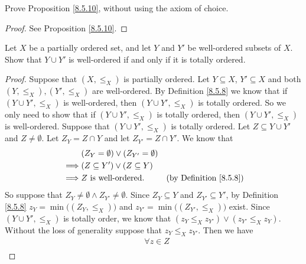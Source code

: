 \begin{exercise}\label{ex 8.5.10}
    Prove Proposition \ref{8.5.10}, without using the axiom of choice.
\end{exercise}

\begin{proof}
    See Proposition \ref{8.5.10}.
\end{proof}

\begin{exercise}\label{ex 8.5.11}
    Let \(X\) be a partially ordered set, and let \(Y\) and \(Y'\) be well-ordered subsets of \(X\).
    Show that \(Y \cup Y'\) is well-ordered if and only if it is totally ordered.
\end{exercise}

\begin{proof}
    Suppose that \((X, \leq_X)\) is partially ordered.
    Let \(Y \subseteq X\), \(Y' \subseteq X\) and both \((Y, \leq_X), (Y', \leq_X)\) are well-ordered.
    By Definition \ref{8.5.8} we know that if \((Y \cup Y', \leq_X)\) is well-ordered, then \((Y \cup Y', \leq_X)\) is totally ordered.
    So we only need to show that if \((Y \cup Y', \leq_X)\) is totally ordered, then \((Y \cup Y', \leq_X)\) is well-ordered.
    Suppose that \((Y \cup Y', \leq_X)\) is totally ordered.
    Let \(Z \subseteq Y \cup Y'\) and \(Z \neq \emptyset\).
    Let \(Z_Y = Z \cap Y\) and let \(Z_{Y'} = Z \cap Y'\).
    We know that
    \begin{align*}
                 & (Z_Y = \emptyset) \lor (Z_{Y'} = \emptyset)                                      \\
        \implies & (Z \subseteq Y') \lor (Z \subseteq Y)                                            \\
        \implies & Z \text{ is well-ordered}.                  & \text{(by Definition \ref{8.5.8})}
    \end{align*}
    So suppose that \(Z_Y \neq \emptyset \land Z_{Y'} \neq \emptyset\).
    Since \(Z_Y \subseteq Y\) and \(Z_{Y'} \subseteq Y'\), by Definition \ref{8.5.8} \(z_Y = \min\big((Z_Y, \leq_X)\big)\) and \(z_{Y'} = \min\big((Z_{Y'}, \leq_X)\big)\) exist.
    Since \((Y \cup Y', \leq_X)\) is totally order, we know that \((z_Y \leq_X z_{Y'}) \lor (z_{Y'} \leq_X z_Y)\).
    Without the loss of generality suppose that \(z_Y \leq_X z_{Y'}\).
    Then we have
    \begin{align*}
                 & \forall z \in Z                                                                       \\

\end{align*}
\end{proof}
